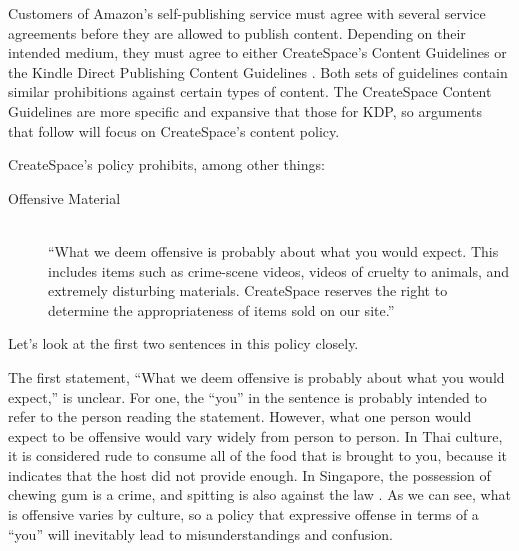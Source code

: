 \documentclass[11pt]{article}
\begin{document}
\begin{multicols}{2}
Customers of Amazon's self-publishing service must agree with several service agreements before they are allowed to publish content.  Depending on their intended medium, they must agree to either CreateSpace's Content Guidelines \cite{CreateSpaceContentGuidelines} or the Kindle Direct Publishing Content Guidelines \cite{AmazonKDPContentGuidelines}.  Both sets of guidelines contain similar prohibitions against certain types of content.  The CreateSpace Content Guidelines are more specific and expansive that those for KDP, so arguments that follow will focus on CreateSpace's content policy.

CreateSpace's policy prohibits, among other things:

\begin{description}
\item[Offensive Material] \hfill \\
      ``What we deem offensive is probably about what you would expect. This includes items such as crime-scene videos, videos of cruelty to animals, and extremely disturbing materials. CreateSpace reserves the right to determine the appropriateness of items sold on our site.'' \cite{CreateSpaceContentGuidelines}

\end{description}

Let's look at the first two sentences in this policy closely.

The first statement, ``What we deem offensive is probably about what you would expect,'' is unclear.  For one, the ``you'' in the sentence is probably intended to refer to the person reading the statement.  However, what one person would expect to be offensive would vary widely from person to person.  In Thai culture, it is considered rude to consume all of the food that is brought to you, because it indicates that the host did not provide enough. \cite{EHowThai}  In Singapore, the possession of chewing gum is a crime, and spitting is also against the law \cite{HotelTravelSingapore}.  As we can see, what is offensive varies by culture, so a policy that expressive offense in terms of a ``you'' will inevitably lead to misunderstandings and confusion.


\end{multicols}
\end{document}
